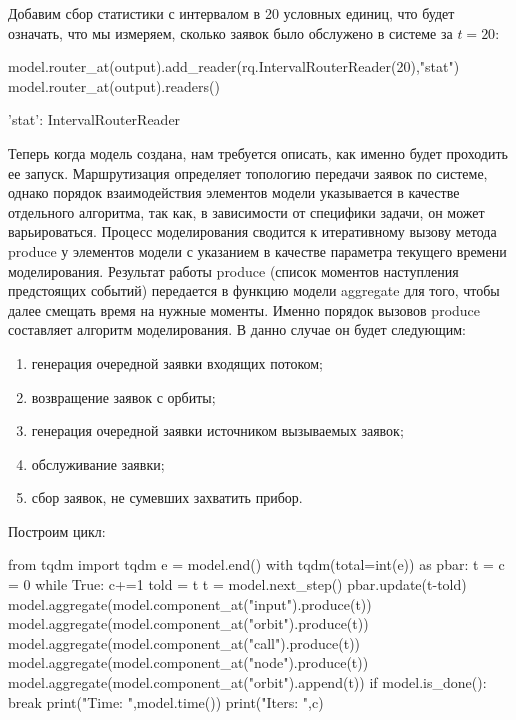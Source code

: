 Добавим сбор статистики с интервалом в 20 условных единиц, что будет означать, что мы измеряем, сколько заявок было обслужено в системе за $t = 20$:

\begin{pyin}
model.router_at(output).add_reader(rq.IntervalRouterReader(20),"stat")
model.router_at(output).readers()
\end{pyin}
\begin{pyout}
'stat': IntervalRouterReader
\end{pyout}

Теперь когда модель создана, нам требуется описать, как именно будет проходить ее запуск. Маршрутизация определяет топологию передачи заявок по системе, однако порядок взаимодействия элементов модели указывается в качестве отдельного алгоритма, так как, в зависимости от специфики задачи, он может варьироваться.
Процесс моделирования сводится к итеративному вызову метода produce у элементов модели с указанием в качестве параметра текущего времени моделирования. Результат работы produce (список моментов наступления предстоящих событий) передается в функцию модели aggregate для того, чтобы далее смещать время на нужные моменты. Именно порядок вызовов produce составляет алгоритм моделирования. В данно случае он будет следующим:
\begin{enumerate}
	\item генерация очередной заявки входящих потоком;
	\item возвращение заявок с орбиты;
	\item генерация очередной заявки источником вызываемых заявок;
	\item обслуживание заявки;
	\item сбор заявок, не сумевших захватить прибор.
\end{enumerate}

Построим цикл:
\begin{pyin}
from tqdm import tqdm
e = model.end()
with tqdm(total=int(e)) as pbar:     
t = c = 0
while True:
    c+=1 
    told = t
    t = model.next_step()
    pbar.update(t-told)
    model.aggregate(model.component_at("input").produce(t))
    model.aggregate(model.component_at("orbit").produce(t))
    model.aggregate(model.component_at("call").produce(t))
    model.aggregate(model.component_at("node").produce(t))
    model.aggregate(model.component_at("orbit").append(t))
    if model.is_done():
        break
print("Time: ",model.time())
print("Iters: ",c)
\end{pyin}

